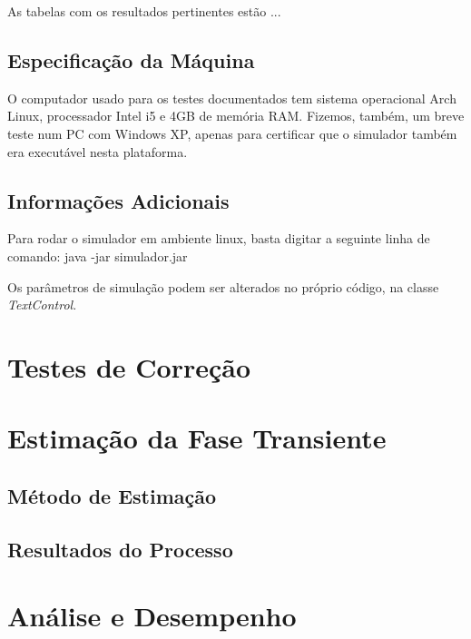 \documentclass[a4paper,12pt]{report}
\begin{document}
As tabelas com os resultados pertinentes estão ...%

\section{Especificação da Máquina}
O computador usado para os testes documentados tem sistema operacional Arch Linux, processador Intel i5 e 4GB de memória RAM. Fizemos, também, um breve teste num PC com Windows XP, apenas para certificar que o simulador também era executável nesta plataforma.

\section{Informações Adicionais}
Para rodar o simulador em ambiente linux, basta digitar a seguinte linha de comando:
java -jar simulador.jar

Os parâmetros de simulação podem ser alterados no próprio código, na classe \textit{TextControl}.

\chapter{Testes de Correção}


\chapter{Estimação da Fase Transiente}

\section{Método de Estimação}

\section{Resultados do Processo}

\chapter{Análise e Desempenho}
\end{document}
